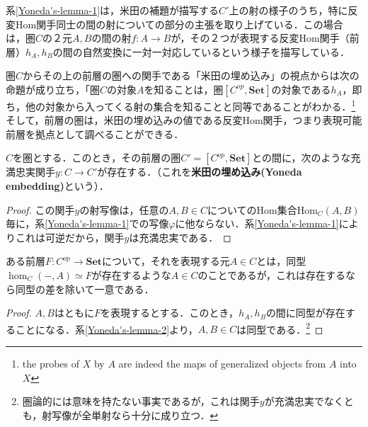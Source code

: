 \documentclass[uplatex, dvipdfmx]{jsreport}
\begin{document}
系\ref{Yoneda's-lemma-1}は，米田の補題が描写する$C'$上の射の様子のうち，特に反変Hom関手同士の間の射についての部分の主張を取り上げている．この場合は，圏$C$の２元$A,B$の間の射$f:A\to B$が，その２つが表現する反変Hom関手（前層）$h_A,h_B$の間の自然変換に一対一対応しているという様子を描写している．

圏$C$からその上の前層の圏への関手である「米田の埋め込み」の視点からは次の命題が成り立ち，「圏$C$の対象$A$を知ることは，圏$[C^{op},\mathbf{Set}]$の対象である$h_A$，即ち，他の対象から入ってくる射の集合を知ることと同等であることがわかる．\footnote{the probes of $X$ by $A$ are indeed the maps of generalized objects from $A$ into $X$}
そして，前層の圏は，米田の埋め込みの値である反変Hom関手，つまり表現可能前層を拠点として調べることができる．
\begin{corollary}\rm{}\label{Yoneda's-lemma-2}
    $C$を圏とする．このとき，その前層の圏$C'=[C^{op},\mathbf{Set}]$との間に，次のような充満忠実関手$y:C\to C'$が存在する．（これを\textbf{米田の埋め込み(Yoneda embedding)}という）．
    \begin{center}\end{center}
\end{corollary}
\begin{proof}\rm{}
    この関手$y$の射写像は，任意の$A,B\in C$についてのHom集合$\mathrm{Hom}_C(A,B)$毎に，系\ref{Yoneda's-lemma-1}での写像$\varphi$に他ならない．系\ref{Yoneda's-lemma-1}によりこれは可逆だから，関手$y$は充満忠実である．
\end{proof}


\begin{corollary}\label{Yoneda's-lemma-3}
    ある前層$F:C^{op}\to\mathbf{Set}$について，それを表現する元$A\in C$とは，同型$\hom_C(-,A)\simeq F$が存在するような$A\in C$のことであるが，これは存在するなら同型の差を除いて一意である．
\end{corollary}
\begin{proof}
    $A,B$はともに$F$を表現するとする．このとき，$h_A,h_B$の間に同型が存在することになる．系\ref{Yoneda's-lemma-2}より，$A,B\in C$は同型である．\footnote{圏論的には意味を持たない事実であるが，これは関手$y$が充満忠実でなくとも，射写像が全単射なら十分に成り立つ．}
\end{proof}
\end{document}
